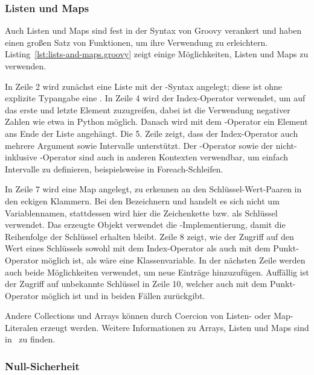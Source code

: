 \subsubsection{Listen und Maps}\label{subsubsec:listen-und-maps}

Auch Listen und Maps sind fest in der Syntax von Groovy verankert und haben einen großen Satz von Funktionen, um ihre Verwendung zu erleichtern.
Listing~\ref{lst:lists-and-maps.groovy} zeigt einige Möglichkeiten, Listen und Maps zu verwenden.


In Zeile 2 wird zunächst eine Liste mit der \code{[]}-Syntax angelegt;
diese ist ohne explizite Typangabe eine .
In Zeile 4 wird der Index-Operator verwendet, um auf das erste und letzte Element zuzugreifen, dabei ist die Verwendung negativer Zahlen wie etwa in Python möglich.
Danach wird mit dem \code{<<}-Operator ein Element ans Ende der Liste angehängt.
Die 5. Zeile zeigt, dass der Index-Operator auch mehrere Argument sowie Intervalle unterstützt.
Der -Operator sowie der nicht-inklusive -Operator sind auch in anderen Kontexten verwendbar, um einfach Intervalle zu definieren, beispielsweise in Foreach-Schleifen.

In Zeile 7 wird eine Map angelegt, zu erkennen an den Schlüssel-Wert-Paaren in den eckigen Klammern.
Bei den Bezeichnern  und  handelt es sich nicht um Variablennamen, stattdessen wird hier die Zeichenkette  bzw.  als Schlüssel verwendet.
Das erzeugte Objekt verwendet die -Implementierung, damit die Reihenfolge der Schlüssel erhalten bleibt.
Zeile 8 zeigt, wie der Zugriff auf den Wert eines Schlüssels sowohl mit dem Index-Operator als auch mit dem Punkt-Operator möglich ist, als wäre  eine Klassenvariable.
In der nächsten Zeile werden auch beide Möglichkeiten verwendet, um neue Einträge hinzuzufügen.
Auffällig ist der Zugriff auf unbekannte Schlüssel in Zeile 10, welcher auch mit dem Punkt-Operator möglich ist und in beiden Fällen  zurückgibt.

Andere Collections und Arrays können durch Coercion von Listen- oder Map-Literalen erzeugt werden.
Weitere Informationen zu Arrays, Listen und Maps sind in~\cite[Abs.~7.-9.]{groovy-lang:syntax} zu finden.

\subsubsection{Null-Sicherheit}


